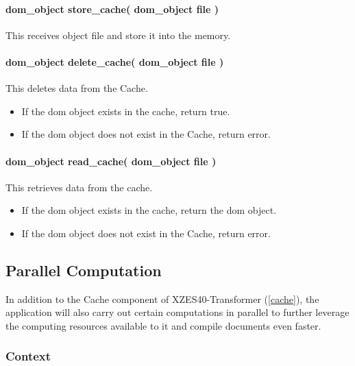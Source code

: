 \begin{enmerate}
\paragraph{dom\_object store\_cache( dom\_object file )} 
This receives object file and store it into the memory.

\paragraph{dom\_object delete\_cache( dom\_object file )}
This deletes data from the Cache.

\begin{itemize}
    \item If the \gls{dom} object exists in the cache, return true.
    \item If the \gls{dom} object does not exist in the Cache, return error.
\end{itemize}

\paragraph{dom\_object read\_cache( dom\_object file )} 
This retrieves data from the cache.

\begin{itemize}
    \item If the \gls{dom} object exists in the cache, return the \gls{dom} object.
    \item If the \gls{dom} object does not exist in the Cache, return error.
\end{itemize}

\subsection{Parallel Computation}
\label{parallel-computation}

In addition to the Cache component of XZES40-Transformer (\ref{cache}), the application will also carry out certain computations in parallel to further leverage the computing resources available to it and compile documents even faster.

\subsubsection{Context}


\end{enmerate}
